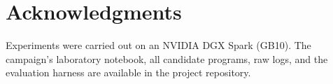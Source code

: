 \documentclass[conference]{IEEEtran}
\begin{document}
\section*{Acknowledgments}
Experiments were carried out on an NVIDIA DGX Spark (GB10). The campaign's
laboratory notebook, all candidate programs, raw logs, and the evaluation
harness are available in the project repository.



\end{document}
